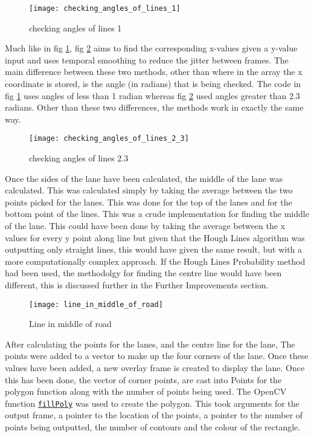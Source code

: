 \documentclass[conference]{IEEEtran}
\begin{document}
\begin{figure}[H]
\centerline{\texttt{[image: checking\_angles\_of\_lines\_1]}}
\caption{checking angles of lines 1}
\label{fig:checking_angles_of_lines_1}
\end{figure}

Much like in fig \ref{fig:checking_angles_of_lines_1}, fig \ref{fig:checking_angles_of_lines_2.3} aims to find the corresponding x-values given a y-value input and uses temporal smoothing to reduce the jitter between frames. The main difference between these two methods, other than where in the array the x coordinate is stored, is the angle (in radians) that is being checked. The code in fig \ref{fig:checking_angles_of_lines_1} uses angles of less than 1 radian whereas fig \ref{fig:checking_angles_of_lines_2.3} used angles greater than 2.3 radians. Other than these two differences, the methods work in exactly the same way. 

\begin{figure}[H]
\centerline{\texttt{[image: checking\_angles\_of\_lines\_2\_3]}}
\caption{checking angles of lines 2.3}
\label{fig:checking_angles_of_lines_2.3}
\end{figure}

Once the sides of the lane have been calculated, the middle of the lane was calculated. This was calculated simply by taking the average between the two points picked for the lanes. This was done for the top of the lanes and for the bottom point of the lines. This was a crude implementation for finding the middle of the lane. This could have been done by taking the average between the x values for every y point along line but given that the Hough Lines algorithm was outputting only straight lines, this would have given the same result, but with a more computationally complex approach. If the Hough Lines Probability method had been used, the methodolgy for finding the centre line would have been different, this is discussed further in the Further Improvements section. 

\begin{figure}[H]
\centerline{\texttt{[image: line\_in\_middle\_of\_road]}}
\caption{Line in middle of road}
\label{fig:line_in_middle_of_road}
\end{figure}

After calculating the points for the lanes, and the centre line for the lane, The points were added to a vector to make up the four corners of the lane. Once these values have been added, a new overlay frame is created to display the lane. Once this has been done, the vector of corner points, are cast into Points for the polygon function along with the number of points being used. The OpenCV function \href{https://docs.opencv.org/4.x/d6/d6e/group__imgproc__draw.html#ga311160e71d37e3b795324d097cb3a7dc}{\texttt{fillPoly}} was used to create the polygon. This took arguments for the output frame, a pointer to the location of the points, a pointer to the number of points being outputted, the number of contours and the colour of the rectangle.
\end{document}

